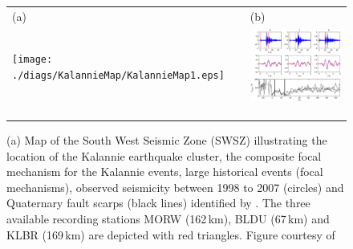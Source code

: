 \documentclass[grl]{agutex}
\begin{document}
\clearpage
\begin{figure}
\begin{tabular}{ll}
(a) & (b) \\
\multirow{15}{*}{\texttt{[image: ./diags/KalannieMap/KalannieMap1.eps]}} &
\multirow{15}{*}{\includegraphics[width = 20pc]{diags/waves_and_CWIest.eps}} \\
\\
\\
\\
\\
\\
\\
\\
\\
\\
\\
\\
\\
\\
\\
\\
\\
\\
\end{tabular}
\caption{(a) Map of the South West Seismic Zone (SWSZ) illustrating the location of the Kalannie earthquake cluster,
the \cite{dr_Dawson08a} composite focal mechanism for the Kalannie events,
large historical events (focal mechanisms), observed seismicity between 1998 to 2007 (circles) and
Quaternary fault scarps (black lines) identified by \citet{dr_Clark09a}. The three available recording stations
MORW (162\,km), BLDU (67\,km) and KLBR (169\,km) are depicted with red triangles. Figure courtesy of
}
\end{figure}
\end{document}
